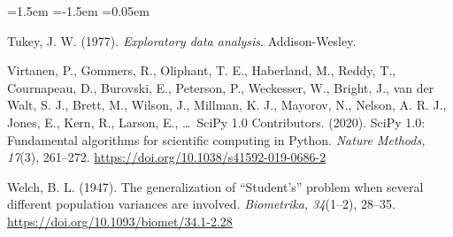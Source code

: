 \documentclass[11pt,a4paper]{article}
\begin{document}
\begin{list}{}{\leftmargin=1.5em \itemindent=-1.5em \itemsep=0.05em \parsep=0pt}
\item Tukey, J. W. (1977). \textit{Exploratory data analysis}. Addison-Wesley.
\item Virtanen, P., Gommers, R., Oliphant, T. E., Haberland, M., Reddy, T., Cournapeau, D., Burovski, E., Peterson, P., Weckesser, W., Bright, J., van der Walt, S. J., Brett, M., Wilson, J., Millman, K. J., Mayorov, N., Nelson, A. R. J., Jones, E., Kern, R., Larson, E., \dots\ SciPy 1.0 Contributors. (2020). SciPy 1.0: Fundamental algorithms for scientific computing in Python. \textit{Nature Methods, 17}(3), 261--272. \url{https://doi.org/10.1038/s41592-019-0686-2}
\item Welch, B. L. (1947). The generalization of ``Student's'' problem when several different population variances are involved. \textit{Biometrika, 34}(1--2), 28--35. \url{https://doi.org/10.1093/biomet/34.1-2.28}
\end{list}
\end{document}
